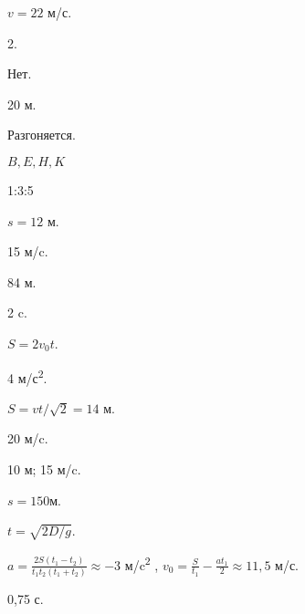 \begin{Answer}{1}
$v = 22$ м/с.
\end{Answer}
\begin{Answer}{3}
2.
\end{Answer}
\begin{Answer}{4}
Нет.
\end{Answer}
\begin{Answer}{5}
20 м.
\end{Answer}
\begin{Answer}{6}
Разгоняется.
\end{Answer}
\begin{Answer}{7}
$B, E, H, K$
\end{Answer}
\begin{Answer}{8}
1:3:5
\end{Answer}
\begin{Answer}{11}
$s = 12$ м.
\end{Answer}
\begin{Answer}{12}
15 м/c.
\end{Answer}
\begin{Answer}{13}
84 м.
\end{Answer}
\begin{Answer}{14}
2 c.
\end{Answer}
\begin{Answer}{15}
$S = 2 v_0 t$.
\end{Answer}
\begin{Answer}{17}
4 м/с\textsuperscript{2}.
\end{Answer}
\begin{Answer}{19}
$S = vt/\sqrt{2} = 14$ м.
\end{Answer}
\begin{Answer}{20}
20 м/c.
\end{Answer}
\begin{Answer}{21}
10 м; 15 м/c.
\end{Answer}
\begin{Answer}{22}
$s = 150 м$.
\end{Answer}
\begin{Answer}{23}
$t = \sqrt{2D/g}$.
\end{Answer}
\begin{Answer}{24}
$a = \frac{2S\left(t_1-t_2\right)}{t_1t_2\left(t_1+t_2\right)} \approx -3$ м/c\textsuperscript{2} , $v_0 = \frac{S}{t_1}-\frac{at_1}{2} \approx 11,5$ м/с.
\end{Answer}
\begin{Answer}{25}
0,75 с.
\end{Answer}
